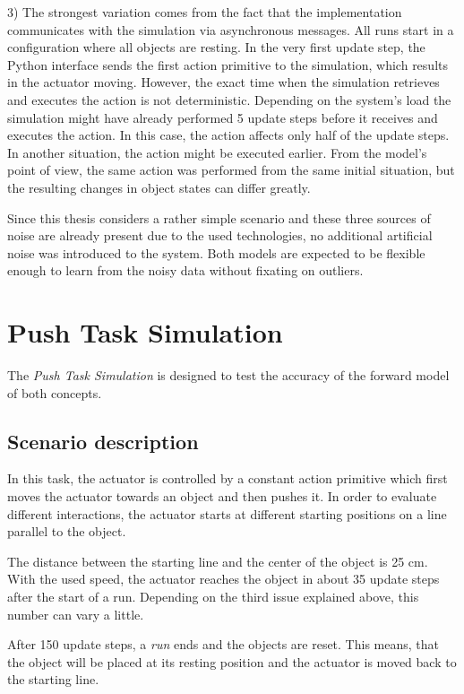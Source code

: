 3) The strongest variation comes from the fact that the implementation communicates with the simulation via asynchronous messages. 
All runs start in a configuration where all objects are resting. In the very first update step, the Python interface sends the first
action primitive to the simulation, which results in the actuator moving. However, the exact time when the simulation retrieves and executes
the action is not deterministic. Depending on the system's load the simulation might have already performed 5 update steps before
it receives and executes the action. In this case, the action affects only half of the update steps. In another situation, the action might
be executed earlier. From the model's point of view, the same action was performed from the same initial situation, but the resulting changes in object states can differ greatly. 

Since this thesis considers a rather simple scenario and these three sources of noise are already present due to the used technologies,
no additional artificial noise was introduced to the system. Both models are expected to be flexible enough to learn from the noisy data without
fixating on outliers.

\section{Push Task Simulation \label{sec:pushTaskSim}}

The \textit{Push Task Simulation} is designed to test the accuracy of the forward model of both concepts. 

\subsection{Scenario description}

In this task, the actuator is controlled by a constant action primitive which first moves the actuator towards an object and then pushes it.
In order to evaluate different interactions, the actuator starts at different starting positions on a line parallel to the object. 

The distance between the starting line and the center of the object is 25 cm. With the used speed, the actuator reaches the object in about 35 update steps after the start of a run. Depending on the third issue explained above, this number can vary a little.

After 150 update steps, a \textit{run} ends and the objects are reset. This means, that the object will be placed at its resting position and the actuator is moved back to the starting line. 

